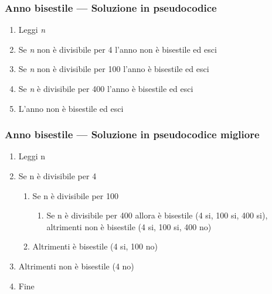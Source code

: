 \documentclass[aspectratio=169,]{beamer}
\begin{document}
\begin{frame}
\frametitle{Anno bisestile --- Soluzione in pseudocodice}
\begin{enumerate}
	\item Leggi \emph{n}
	\item Se \emph{n} non è divisibile per 4 l'anno \alert{non è} bisestile ed esci
	\item Se \emph{n} non è divisibile per 100 l'anno \alert{è} bisestile ed esci
	\item Se \emph{n} è divisibile per 400 l'anno \alert{è} bisestile ed esci
	\item L'anno \alert{non è} bisestile ed esci
\end{enumerate}
\end{frame}

\begin{frame}
\frametitle{Anno bisestile --- Soluzione in pseudocodice migliore}
\begin{enumerate}
	\item Leggi n
	\item Se n è divisibile per 4
	\begin{enumerate}
		\item Se n è divisibile per 100
		\begin{enumerate}
			\item Se n è divisibile per 400 allora \alert{è} bisestile (4 si, 100 si, 400 si), altrimenti \alert{non è} bisestile (4 si, 100 si, 400 no)
		\end{enumerate}
		\item Altrimenti \alert{è} bisestile (4 si, 100 no)
	\end{enumerate}
	\item Altrimenti \alert{non è} bisestile (4 no)
	\item Fine
\end{enumerate}
\end{frame}
\end{document}
